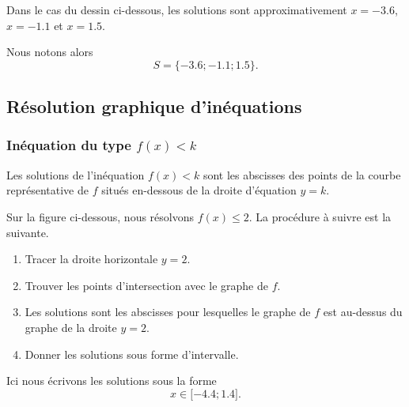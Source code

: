Dans le cas du dessin ci-dessous, les solutions sont approximativement \( x=-3.6\), \( x=-1.1\) et \( x=1.5\).

\begin{center}

\end{center}

Nous notons alors
\begin{equation}
    S=\{ -3.6;-1.1;1.5 \}.
\end{equation}

\subsection{Résolution graphique d'inéquations}


\subsubsection{Inéquation du type $f(x)<k$}

\begin{Aretenir}
Les solutions de l'inéquation $f(x)<k$ sont les abscisses des points de la courbe représentative de \( f\) situés en-dessous de la droite d'équation $y=k$.
\end{Aretenir}

Sur la figure ci-dessous, nous résolvons \( f(x)\leq 2\). La procédure à suivre est la suivante.
\begin{enumerate}
    \item
        Tracer la droite horizontale \( y=2\).
    \item
        Trouver les points d'intersection avec le graphe de \( f\).
    \item
        Les solutions sont les abscisses pour lesquelles le graphe de \( f\) est au-dessus du graphe de la droite \( y=2\).
    \item
        Donner les solutions sous forme d'intervalle.
\end{enumerate}


\begin{center}
    
\end{center}
Ici nous écrivons les solutions sous la forme
\begin{equation}
    x\in\mathopen[ -4.4 ; 1.4 \mathclose].
\end{equation}
